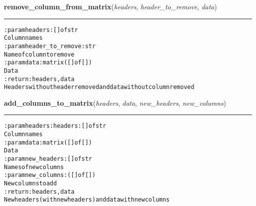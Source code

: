     \vspace{0.5ex}

\hspace{.8\funcindent}\begin{boxedminipage}{\funcwidth}

    \raggedright \textbf{remove\_column\_from\_matrix}(\textit{headers}, \textit{header\_to\_remove}, \textit{data})

    \vspace{-1.5ex}

    \rule{\textwidth}{0.5\fboxrule}
\setlength{\parskip}{2ex}
\begin{alltt}

:param headers: [] of str
    Column names
:param header\_to\_remove: str
    Name of column to remove
:param data: matrix ([] of [])
    Data
:return: headers, data
    Headers without header removed and data without column removed
\end{alltt}

\setlength{\parskip}{1ex}
    \end{boxedminipage}

    \label{hal:ml:utils:matrix:add_columns_to_matrix}

    \vspace{0.5ex}

\hspace{.8\funcindent}\begin{boxedminipage}{\funcwidth}

    \raggedright \textbf{add\_columns\_to\_matrix}(\textit{headers}, \textit{data}, \textit{new\_headers}, \textit{new\_columns})

    \vspace{-1.5ex}

    \rule{\textwidth}{0.5\fboxrule}
\setlength{\parskip}{2ex}
\begin{alltt}

:param headers: headers: [] of str
    Column names
:param data: matrix ([] of [])
    Data
:param new\_headers: [] of str
    Names of new columns
:param new\_columns: ([] of [])
    New columns to add
:return: headers, data
    New headers (with new headers) and data with new columns
\end{alltt}

\setlength{\parskip}{1ex}
    \end{boxedminipage}


